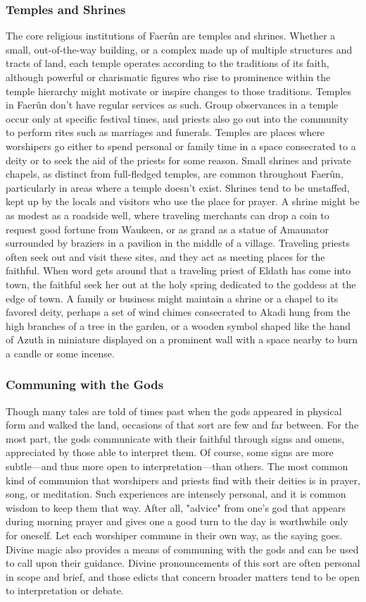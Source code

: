 \documentclass[10pt,a4paper,twoside,twocolumn,openany,bg=print,nodeprecatedcode]{dndbook}
\begin{document}
\subsubsection{Temples and Shrines}
The core religious institutions of Faerûn are temples and shrines. Whether a small, out-of-the-way building, or a complex made up of multiple structures and tracts of land, each temple operates according to the traditions of its faith, although powerful or charismatic figures who rise to prominence within the temple hierarchy might motivate or inspire changes to those traditions.
Temples in Faerûn don't have regular services as such. Group observances in a temple occur only at specific festival times, and priests also go out into the community to perform rites such as marriages and funerals. Temples are places where worshipers go either to spend personal or family time in a space consecrated to a deity or to seek the aid of the priests for some reason.
Small shrines and private chapels, as distinct from full-fledged temples, are common throughout Faerûn, particularly in areas where a temple doesn't exist. Shrines tend to be unstaffed, kept up by the locals and visitors who use the place for prayer. A shrine might be as modest as a roadside well, where traveling merchants can drop a coin to request good fortune from Waukeen, or as grand as a statue of Amaunator surrounded by braziers in a pavilion in the middle of a village.
Traveling priests often seek out and visit these sites, and they act as meeting places for the faithful. When word gets around that a traveling priest of Eldath has come into town, the faithful seek her out at the holy spring dedicated to the goddess at the edge of town.
A family or business might maintain a shrine or a chapel to its favored deity, perhaps a set of wind chimes consecrated to Akadi hung from the high branches of a tree in the garden, or a wooden symbol shaped like the hand of Azuth in miniature displayed on a prominent wall with a space nearby to burn a candle or some incense.
\subsubsection{Communing with the Gods}
Though many tales are told of times past when the gods appeared in physical form and walked the land, occasions of that sort are few and far between. For the most part, the gods communicate with their faithful through signs and omens, appreciated by those able to interpret them. Of course, some signs are more subtle—and thus more open to interpretation—than others.
The most common kind of communion that worshipers and priests find with their deities is in prayer, song, or meditation. Such experiences are intensely personal, and it is common wisdom to keep them that way. After all, "advice" from one's god that appears during morning prayer and gives one a good turn to the day is worthwhile only for oneself. Let each worshiper commune in their own way, as the saying goes.
Divine magic also provides a means of communing with the gods and can be used to call upon their guidance. Divine pronouncements of this sort are often personal in scope and brief, and those edicts that concern broader matters tend to be open to interpretation or debate.
\end{document}
